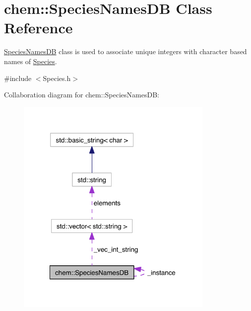 \hypertarget{classchem_1_1SpeciesNamesDB}{\section{chem\-:\-:Species\-Names\-D\-B Class Reference}
\label{classchem_1_1SpeciesNamesDB}
}


\hyperlink{classchem_1_1SpeciesNamesDB}{Species\-Names\-D\-B} class is used to associate unique integers with character based names of \hyperlink{classchem_1_1Species}{Species}.  




{\ttfamily \#include $<$Species.\-h$>$}



Collaboration diagram for chem\-:\-:Species\-Names\-D\-B\-:\nopagebreak
\begin{figure}[H]
\begin{center}
\leavevmode
\includegraphics[width=270pt]{classchem_1_1SpeciesNamesDB__coll__graph}
\end{center}
\end{figure}
